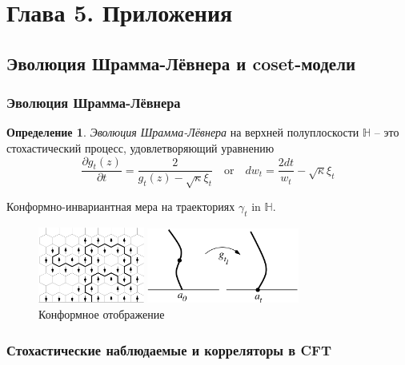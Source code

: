 \documentclass[pdftex]{beamer}
\theoremstyle{definition} \newtheorem{Def}{Определение}
\begin{document}
\section{Глава 5. Приложения}
\label{sec:applications}

\subsection{Эволюция Шрамма-Лёвнера и coset-модели}
\label{sec:SLE}
\begin{frame}
  \frametitle{Эволюция Шрамма-Лёвнера}
  \begin{Def}
    {\it Эволюция Шрамма-Лёвнера} на верхней полуплоскости  $\mathbb{H}$ -- это стохастический процесс, удовлетворяющий уравнению
    \begin{equation*}
      \frac{\partial g_t(z)}{\partial t} = \frac{ 2}{g_t(z)-\sqrt{\kappa}\xi_{t}} \quad \text{or} \quad       d w _{t}= \frac{2dt}{w_{t} }-\sqrt{\kappa}\xi_{t}
    \end{equation*}
  \end{Def}
  Конформно-инвариантная мера на траекториях $\gamma_{t}$ in $\mathbb{H}$.
  \begin{figure}[h]
    \begin{multicols}{2}
      \hfill
      \includegraphics[height=25mm]{figures/explore.pdf}
      \vspace{-0.2cm}
      \caption{Эволюция Шрамма-Лёвнера -- непрерывный предел интерфейсов}
      \label{fig:sle}
      \hfill
      \includegraphics[width=50mm]{figures/loewner.pdf}
      \caption{Конформное отображение}
      \label{fig:sle}
    \end{multicols}

  \end{figure}
\end{frame}

\begin{frame}
  \frametitle{Стохастические наблюдаемые и корреляторы в CFT}
\end{frame}
\end{document}

